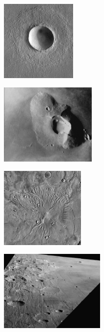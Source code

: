 \begin{figure}[h]
	\centering
	\begin{subfigure}[t]{0.3\textwidth}
		\centering
		\includegraphics[height=4cm,keepaspectratio]{images/Gre13_01.jpg}
		\captionsetup{format=plain}
		\label{fig:ex_crater}
	\end{subfigure}
	\hfill
	\begin{subfigure}[t]{0.34\textwidth}
		\centering
		\includegraphics[height=4cm,keepaspectratio]{images/Gre13_02.jpg}
		\captionsetup{format=plain}
		\label{fig:ex_vulc1}
	\end{subfigure}
	\hfill
	\begin{subfigure}[t]{0.3\textwidth}
		\centering
		\includegraphics[height=4cm,keepaspectratio]{images/Gre13_03.jpg}
		\captionsetup{format=plain}
		\label{fig:ex_vulc2}
	\end{subfigure}
	\hfill
	\begin{subfigure}[t]{0.35\textwidth}
		\centering
		\includegraphics[height=4cm,keepaspectratio]{images/Gre13_04.jpg}

\end{subfigure}
\end{figure}
